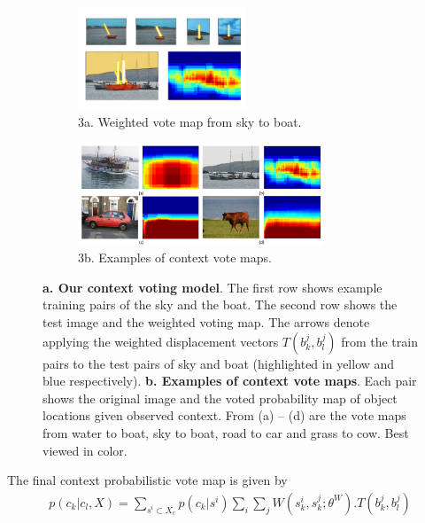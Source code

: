 \captionsetup[subfigure]{labelformat=empty}
\begin{figure}[ht!]
\centering
\begin{subfigure}[t]{0.48\textwidth}
\centering
\includegraphics[height=1.2in]{figures/vote_sky_boat.pdf}
\caption{3a. Weighted vote map from sky to boat.}
\label{fig:vote_sky_boat}
\end{subfigure}
\begin{subfigure}[t]{0.48\textwidth}
\centering
\includegraphics[height=1.2in]{figures/votemap.pdf}
\caption{3b. Examples of context vote maps.}
\label{fig:votemap}
\end{subfigure}
\caption{{\bf a.  Our context voting model}. The first row shows example training pairs of the sky and the boat. 
The second row shows the test image and the weighted voting map. 
The arrows denote applying the weighted displacement vectors $T(b_k^j,b_l^j)$ from the train pairs to the test pairs of sky and boat
(highlighted in yellow and blue respectively). 
{\bf b. Examples of context vote maps}. Each pair shows the original image and the voted probability
map of object locations given observed context. From (a) -- (d) are the vote maps from water to boat, sky to boat, road to car and grass to cow. Best viewed in color.
}
\end{figure}

The final context probabilistic vote map is given by
\begin{eqnarray}
p(c_k|c_l,X) =  \sum_{s^i \subset X_c} p(c_k|s^i) \sum_{i} \sum_{j} W(s_k^i,s_k^j;\theta^W).T(b_k^j,b_l^j)\nonumber\\
\end{eqnarray}

